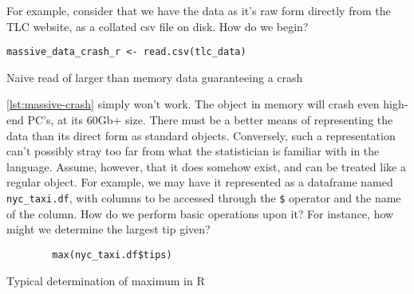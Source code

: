 For example, consider that we have the data as it's raw form directly
from the TLC website, as a collated csv file on disk. How do we begin?

\begin{listing}
    \begin{verbatim}
massive_data_crash_r <- read.csv(tlc_data)
\end{verbatim}
    \caption{Naive read of larger than memory data guaranteeing a crash}
    \label{lst:massive-crash}
\end{listing}

\cref{lst:massive-crash} simply won't work. The object in memory will crash even high-end
PC's, at its 60Gb+ size. There must be a better means of representing
the data than its direct form as standard \R objects. Conversely, such a
representation can't possibly stray too far from what the statistician
is familiar with in the language. Assume, however, that it does somehow
exist, and can be treated like a regular object. For example, we may
have it represented as a dataframe named \texttt{nyc\_taxi.df}, with
columns to be accessed through the \texttt{\$} operator and the name of
the column. How do we perform basic operations upon it? For instance,
how might we determine the largest tip given?

\begin{listing}
    \begin{verbatim}
        max(nyc_taxi.df$tips)
\end{verbatim}
    \caption{Typical determination of maximum in R}
    \label{lst:max-tip}
\end{listing}


